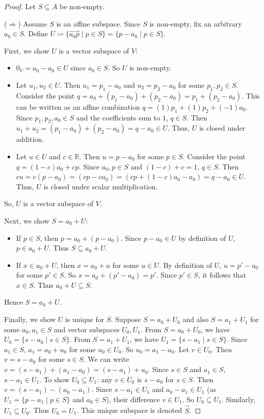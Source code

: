 \begin{proof}

Let $S \subseteq A$ be non-empty.

($\Rightarrow$) Assume $S$ is an affine subspace. Since $S$ is non-empty, fix an arbitrary $a_0 \in S$. Define $U \coloneqq \{ \vec{a_0 p} \mid p \in S \} = \{ p - a_0 \mid p \in S \}$.

First, we show $U$ is a vector subspace of $V$:
\begin{itemize}
    \item $0_V = a_0 - a_0 \in U$ since $a_0 \in S$. So $U$ is non-empty.
    \item Let $u_1, u_2 \in U$. Then $u_1 = p_1 - a_0$ and $u_2 = p_2 - a_0$ for some $p_1, p_2 \in S$. Consider the point $q = a_0 + (p_1 - a_0) + (p_2 - a_0) = p_1 + (p_2 - a_0)$. This can be written as an affine combination $q = (1)p_1 + (1)p_2 + (-1)a_0$. Since $p_1, p_2, a_0 \in S$ and the coefficients sum to $1$, $q \in S$. Then $u_1 + u_2 = (p_1 - a_0) + (p_2 - a_0) = q - a_0 \in U$. Thus, $U$ is closed under addition.
    \item Let $u \in U$ and $c \in \mathbb{R}$. Then $u = p - a_0$ for some $p \in S$. Consider the point $q = (1-c)a_0 + cp$. Since $a_0, p \in S$ and $(1-c)+c = 1$, $q \in S$. Then $cu = c(p - a_0) = (cp - ca_0) = (cp + (1-c)a_0 - a_0) = q - a_0 \in U$. Thus, $U$ is closed under scalar multiplication.
\end{itemize}
So, $U$ is a vector subspace of $V$.

Next, we show $S = a_0 + U$:
\begin{itemize}
    \item If $p \in S$, then $p = a_0 + (p - a_0)$. Since $p-a_0 \in U$ by definition of $U$, $p \in a_0 + U$. Thus $S \subseteq a_0 + U$.
    \item If $x \in a_0 + U$, then $x = a_0 + u$ for some $u \in U$. By definition of $U$, $u = p' - a_0$ for some $p' \in S$. So $x = a_0 + (p' - a_0) = p'$. Since $p' \in S$, it follows that $x \in S$. Thus $a_0 + U \subseteq S$.
\end{itemize}
Hence $S = a_0 + U$.

Finally, we show $U$ is unique for $S$. Suppose $S = a_0 + U_0$ and also $S = a_1 + U_1$ for some $a_0, a_1 \in S$ and vector subspaces $U_0, U_1$.
From $S = a_0 + U_0$, we have $U_0 = \{s - a_0 \mid s \in S\}$.
From $S = a_1 + U_1$, we have $U_1 = \{s - a_1 \mid s \in S\}$.
Since $a_1 \in S$, $a_1 = a_0 + u_0$ for some $u_0 \in U_0$. So $u_0 = a_1 - a_0$.
Let $v \in U_0$. Then $v = s - a_0$ for some $s \in S$. We can write $v = (s - a_1) + (a_1 - a_0) = (s - a_1) + u_0$.
Since $s \in S$ and $a_1 \in S$, $s-a_1 \in U_1$.
To show $U_0 \subseteq U_1$: any $v \in U_0$ is $s - a_0$ for $s \in S$. Then $v = (s-a_1) - (a_0-a_1)$. Since $s-a_1 \in U_1$ and $a_0-a_1 \in U_1$ (as $U_1 = \{p-a_1 \mid p \in S\}$ and $a_0 \in S$), their difference $v \in U_1$. So $U_0 \subseteq U_1$.
Similarly, $U_1 \subseteq U_0$. Thus $U_0 = U_1$. This unique subspace is denoted $\vec{S}$.


\end{proof}
